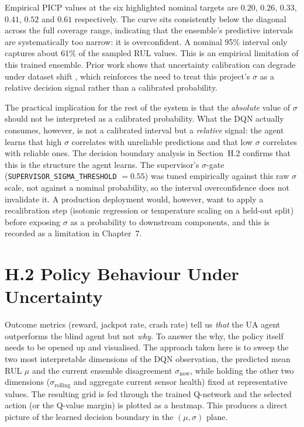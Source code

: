 \documentclass[12pt,a4paper]{report}
\begin{document}
Empirical PICP values at the six highlighted nominal targets are $0.20$, $0.26$, $0.33$, $0.41$, $0.52$ and $0.61$ respectively. The curve sits consistently below the diagonal across the full coverage range, indicating that the ensemble's predictive intervals are systematically too narrow: it is overconfident. A nominal 95\% interval only captures about 61\% of the sampled RUL values. This is an empirical limitation of this trained ensemble. Prior work shows that uncertainty calibration can degrade under dataset shift \citep{ovadia2019can}, which reinforces the need to treat this project's $\sigma$ as a relative decision signal rather than a calibrated probability.

The practical implication for the rest of the system is that the \textit{absolute} value of $\sigma$ should not be interpreted as a calibrated probability. What the DQN actually consumes, however, is not a calibrated interval but a \textit{relative} signal: the agent learns that high $\sigma$ correlates with unreliable predictions and that low $\sigma$ correlates with reliable ones. The decision boundary analysis in Section~H.2 confirms that this is the structure the agent learns. The supervisor's $\sigma$-gate (\texttt{SUPERVISOR\_SIGMA\_THRESHOLD} $= 0.55$) was tuned empirically against this raw $\sigma$ scale, not against a nominal probability, so the interval overconfidence does not invalidate it. A production deployment would, however, want to apply a recalibration step (isotonic regression or temperature scaling on a held-out split) before exposing $\sigma$ as a probability to downstream components, and this is recorded as a limitation in Chapter~7.

\section*{H.2 Policy Behaviour Under Uncertainty}
\label{sec:app_policy}

Outcome metrics (reward, jackpot rate, crash rate) tell us \textit{that} the UA agent outperforms the blind agent but not \textit{why}. To answer the why, the policy itself needs to be opened up and visualised. The approach taken here is to sweep the two most interpretable dimensions of the DQN observation, the predicted mean RUL $\mu$ and the current ensemble disagreement $\sigma_{\text{now}}$, while holding the other two dimensions ($\sigma_{\text{rolling}}$ and aggregate current sensor health) fixed at representative values. The resulting grid is fed through the trained Q-network and the selected action (or the Q-value margin) is plotted as a heatmap. This produces a direct picture of the learned decision boundary in the $(\mu, \sigma)$ plane.
\end{document}
